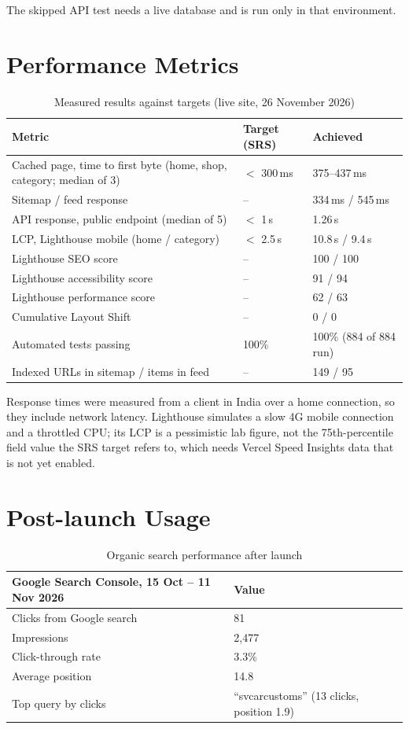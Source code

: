 \documentclass{tietreport}
\begin{document}
The skipped API test needs a live database and is run only in that
environment.

\section{Performance Metrics}

\begin{table}[H]
\centering\small
\begin{tabularx}{\linewidth}{X l l}
\toprule
\textbf{Metric} & \textbf{Target (SRS)} & \textbf{Achieved} \\
\midrule
Cached page, time to first byte (home, shop, category; median of 3) & $<$ 300\,ms & 375--437\,ms \\
Sitemap / feed response & -- & 334\,ms / 545\,ms \\
API response, public endpoint (median of 5) & $<$ 1\,s & 1.26\,s \\
LCP, Lighthouse mobile (home / category) & $<$ 2.5\,s & 10.8\,s / 9.4\,s \\
Lighthouse SEO score & -- & 100 / 100 \\
Lighthouse accessibility score & -- & 91 / 94 \\
Lighthouse performance score & -- & 62 / 63 \\
Cumulative Layout Shift & -- & 0 / 0 \\
Automated tests passing & 100\% & 100\% (884 of 884 run) \\
Indexed URLs in sitemap / items in feed & -- & 149 / 95 \\
\bottomrule
\end{tabularx}
\caption{Measured results against targets (live site, 26 November 2026)}
\label{tab:perf}
\end{table}

Response times were measured from a client in India over a home connection,
so they include network latency. Lighthouse simulates a slow 4G mobile
connection and a throttled CPU; its LCP is a pessimistic lab figure, not the
75th-percentile field value the SRS target refers to, which needs Vercel
Speed Insights data that is not yet enabled.

\section{Post-launch Usage}\label{sec:analytics}

\begin{table}[H]
\centering\small
\begin{tabularx}{\linewidth}{X l}
\toprule
\textbf{Google Search Console, 15 Oct -- 11 Nov 2026} & \textbf{Value} \\
\midrule
Clicks from Google search & 81 \\
Impressions & 2,477 \\
Click-through rate & 3.3\% \\
Average position & 14.8 \\
Top query by clicks & ``svcarcustoms'' (13 clicks, position 1.9) \\
\bottomrule
\end{tabularx}
\caption{Organic search performance after launch}
\label{tab:gsc}
\end{table}
\end{document}
